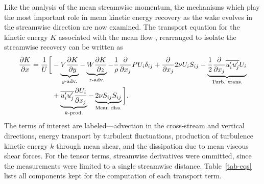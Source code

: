Like the analysis of the mean streamwise momentum, the mechanisms which play the
most important role in mean kinetic energy recovery as the wake evolves in the
streamwise direction are now examined. The transport equation for the kinetic
energy $K$ associated with the mean flow \cite{TennekesAndLumley}, rearranged to
isolate the streamwise recovery can be written as
\begin{equation}
\begin{split}
\frac{\p K}{\p x}
=
\frac{1}{U}
\bigg{[}
& - \underbrace{V \frac{\p K}{\p y}}_{y\text{-adv.}}
- \underbrace{W \frac{\p K}{\p z}}_{z\text{-adv.}}
- \frac{1}{\rho}\frac{\p}{\p x_j} P U_i \delta_{ij}
+ \frac{\p}{\p x_j} 2 \nu U_i S_{ij} %
- \underbrace{
    \frac{1}{2}\frac{\p}{\p x_j} \overline{u_i' u_j'} U_i
}_{\text{Turb. trans.}} \\
& + 
\underbrace{
    \overline{u_i' u_j'} \frac{\p U_i}{\p x_j}
}_{k\text{-prod.}}
- 
\underbrace{
    2 \nu S_{ij}S_{ij}
}_{\text{Mean diss.}}
\bigg{]}.
\label{eq-K_full}
\end{split}
\end{equation}
The terms of interest are labeled---advection in the cross-stream and vertical
directions, energy transport by turbulent fluctuations, production of turbulence
kinetic energy $k$ through mean shear, and the dissipation due to mean viscous
shear forces. For the tensor terms, streamwise derivatives were ommitted, since
the measurements were limited to a single streamwise distance.
Table~\ref{tab-eqs} lists all components kept for the computation of each
transport term.

